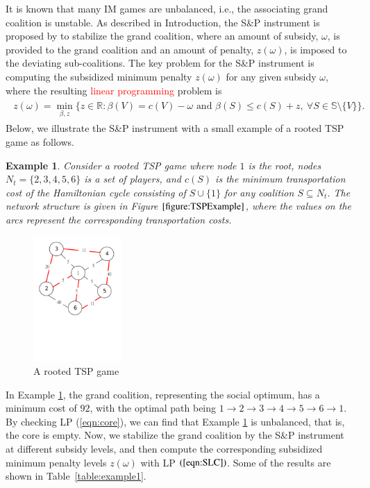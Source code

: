 \documentclass[authoryear,review,12pt]{elsarticle}
\newtheorem{example}{Example}
\newcommand{\R}{\mathbb{R}}
\begin{document}
It is known that many IM games are unbalanced, i.e., the associating grand coalition is unstable.
As described in Introduction, the S\&P instrument is proposed by \cite{leastcore2018} to stabilize the grand coalition, where an amount of subsidy, $\omega$, is provided to the grand coalition and an amount of penalty, $z(\omega)$, is imposed to the deviating sub-coalitions.
The key problem for the S\&P instrument is computing the subsidized minimum penalty $z(\omega)$ for any given subsidy $\omega$, where the resulting
\textcolor{red}{linear programming} problem is
\begin{eqnarray*}
\begin{aligned}
z(\omega) = \min_{\beta,z} \bigg\{ z \in \R:\beta(V)=c(V)-\omega \mbox{ and } \beta(S) \leq c(S)+z,~\forall S \in \mathbb{S} \setminus \{V\} \bigg\}.
\end{aligned}
\end{eqnarray*}
Below, we illustrate the S\&P instrument with a small example of a rooted TSP game as follows.
\renewcommand{\baselinestretch}{1.5}
\begin{example}\label{example:1}
Consider a rooted TSP game where node $1$ is the root, nodes $N_t=\big\{ 2,3,4,5,6 \big\}$ is a set of players, and $c(S)$ is the minimum transportation cost of the Hamiltonian cycle consisting of $S \cup \{ 1 \}$ for any coalition $S \subseteq N_t$. The network structure is given in Figure $\ref{figure:TSPExample}$, where the values on the arcs represent the corresponding transportation costs.
\end{example}
\begin{figure}[H]
\centering
\includegraphics[width=0.3\textwidth]{ExampleTSP.pdf}
\caption{\label{figure:TSPExample}A rooted TSP game}
\vspace{-5mm}
\end{figure}

In Example \ref{example:1}, the grand coalition, representing the social optimum, has a minimum cost of $92$, with the optimal path being $1 \rightarrow 2 \rightarrow 3 \rightarrow 4 \rightarrow 5 \rightarrow 6 \rightarrow 1$.
By checking LP (\ref{eqn:core}), we can find that Example \ref{example:1} is unbalanced, that is, the core is empty.
Now, we stabilize the grand coalition by the S\&P instrument at different subsidy levels, and then compute the corresponding subsidized minimum penalty levels $z(\omega)$ with LP $(\ref{eqn:SLC})$. Some of the results are shown in Table~\ref{table:example1}.
\end{document}
